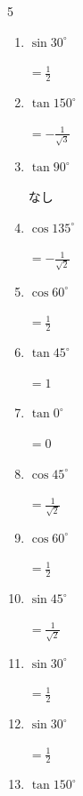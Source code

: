 \begin{multicols}{5}
\begin{enumerate}
        $\displaystyle =1$

  \item $\displaystyle \sin{30^\circ}$

        $\displaystyle =\frac{1}{2}$

  \item $\displaystyle \tan{150^\circ}$

        $\displaystyle =-\frac{1}{\sqrt{3}}$

  \item $\displaystyle \tan{90^\circ}$

        $\displaystyle なし$

\columnbreak %

  \item $\displaystyle \cos{135^\circ}$

        $\displaystyle =-\frac{1}{\sqrt{2}}$

  \item $\displaystyle \cos{60^\circ}$

        $\displaystyle =\frac{1}{2}$

  \item $\displaystyle \tan{45^\circ}$

        $\displaystyle =1$

  \item $\displaystyle \tan{0^\circ}$

        $\displaystyle =0$

  \item $\displaystyle \cos{45^\circ}$

        $\displaystyle =\frac{1}{\sqrt{2}}$

  \item $\displaystyle \cos{60^\circ}$

        $\displaystyle =\frac{1}{2}$

  \item $\displaystyle \sin{45^\circ}$

        $\displaystyle =\frac{1}{\sqrt{2}}$

  \item $\displaystyle \sin{30^\circ}$

        $\displaystyle =\frac{1}{2}$

  \item $\displaystyle \sin{30^\circ}$

        $\displaystyle =\frac{1}{2}$

  \item $\displaystyle \tan{150^\circ}$


\end{enumerate}
\end{multicols}
